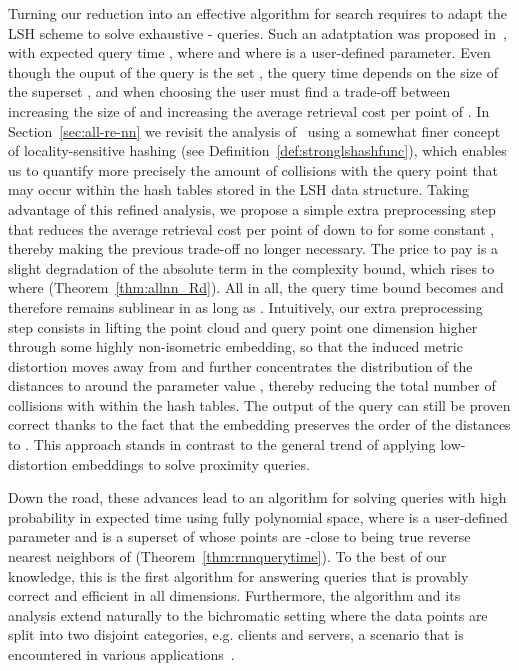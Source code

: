 Turning our reduction into an effective algorithm for \rnn search
requires to adapt the LSH scheme to solve exhaustive -\pleb
queries. Such an adatptation was proposed in~\cite[Chapter~1]{SDI05},
with expected query time , where  and where  is a user-defined
parameter. Even though the ouput of the query is the set
, the query time depends on the size of the superset
, and when choosing  the user must find a
trade-off between increasing the size of  and
increasing the average retrieval cost  per point of
. In Section~\ref{sec:all-re-nn} we revisit the
analysis of~\cite[Chapter~1]{SDI05} using a somewhat finer concept of
locality-sensitive hashing (see
Definition~\ref{def:stronglshashfunc}), which enables us to quantify
more precisely the amount of collisions with the query point that may
occur within the hash tables stored in the LSH data structure. Taking
advantage of this refined analysis, we propose a simple extra
preprocessing step that reduces the average retrieval cost per point
of  down to  for some constant
, thereby making the previous trade-off no
longer necessary. The price to pay is a slight degradation of the
absolute term  in the complexity bound, which rises to
 where 
(Theorem~\ref{thm:allnn_Rd}). All in all, the query time bound becomes
 and
therefore remains sublinear in  as long as .  Intuitively, our extra preprocessing step consists
in lifting the point cloud  and query point  one dimension
higher through some highly non-isometric embedding, so that the
induced metric distortion moves  away from  and further
concentrates the distribution of the distances to  around the
parameter value , thereby reducing the total number of collisions
with  within the hash tables. The output of the query can still be
proven correct thanks to the fact that the embedding preserves the
order of the distances to . This approach stands in contrast to the
general trend of applying low-distortion embeddings to solve proximity
queries.

Down the road, these advances lead to an algorithm for solving \rnn
queries with high probability in expected  time using fully polynomial space, where 
is a user-defined parameter and  is a superset
of  whose points are -close to being true
reverse nearest neighbors of  (Theorem~\ref{thm:rnnquerytime}). To
the best of our knowledge, this is the first algorithm for answering
\rnn queries that is provably correct and efficient in
all dimensions. Furthermore, the algorithm and its analysis extend
naturally to the bichromatic setting where the data points are split
into two disjoint categories, e.g. clients and servers, a scenario
that is encountered in various applications~\cite{KM00}.

